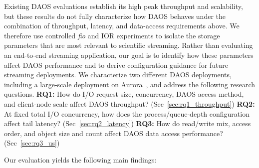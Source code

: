 Existing DAOS evaluations establish its high peak throughput and scalability, but these results do not fully characterize how DAOS behaves under the combination of throughput, latency, and data-access requirements above. We therefore use controlled \textit{fio} and IOR experiments to isolate the storage parameters that are most relevant to scientific streaming. Rather than evaluating an end-to-end streaming application, our goal is to identify how these parameters affect DAOS performance and to derive configuration guidance for future streaming deployments. We characterize two different DAOS deployments, including a large-scale deployment on Aurora~\cite{aurora-intro2025}, and address the following research questions. \textbf{RQ1:} How do I/O request size, concurrency, DAOS access method, and client-node scale affect DAOS throughput? (Sec~\ref{sec:rq1_throughput}) \textbf{RQ2:} At fixed total I/O concurrency, how does the process/queue-depth configuration affect tail latency? (Sec~\ref{sec:rq2_latency}) \textbf{RQ3:} How do read/write mix, access order, and object size and count affect DAOS data access performance? (Sec~\ref{sec:rq3_us}) %

Our evaluation yields the following main findings:

